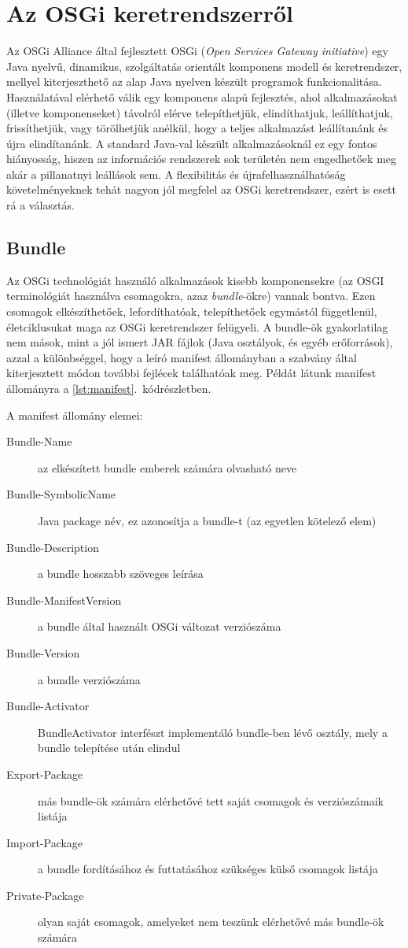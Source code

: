 \chapter{Az OSGi keretrendszerről}
\label{cha:osgi}

Az OSGi Alliance \cite{osgi} által fejlesztett OSGi (\textit{Open Services Gateway initiative}) egy Java nyelvű, dinamikus, szolgáltatás orientált komponens modell és keretrendszer, mellyel kiterjeszthető az alap Java nyelven készült programok funkcionalitása. Használatával elérhető válik egy komponens alapú fejlesztés, ahol alkalmazásokat (illetve komponenseket) távolról elérve telepíthetjük, elindíthatjuk, leállíthatjuk, frissíthetjük, vagy törölhetjük anélkül, hogy a teljes alkalmazást leállítanánk és újra elindítanánk. A standard Java-val készült alkalmazásoknál ez egy fontos hiányosság, hiszen az információs rendszerek sok területén nem engedhetőek meg akár a pillanatnyi leállások sem. A flexibilitás és újrafelhasználhatóság követelményeknek tehát nagyon jól megfelel az OSGi keretrendszer, ezért is esett rá a választás.

\section{Bundle}
\label{sec:bundle}

Az OSGi technológiát \cite{osgiintro} használó alkalmazások kisebb komponensekre (az OSGI terminológiát használva csomagokra, azaz \textit{bundle}-ökre) vannak bontva. Ezen csomagok elkészíthetőek, lefordíthatóak, telepíthetőek egymástól függetlenül, életciklusukat maga az OSGi keretrendszer felügyeli. A bundle-ök gyakorlatilag nem mások, mint a jól ismert JAR fájlok (Java osztályok, és egyéb erőforrások), azzal a különbséggel, hogy a leíró manifest állományban a szabvány által kiterjesztett módon további fejlécek találhatóak meg. Példát látunk manifest állományra a \ref{lst:manifest}.~kódrészletben.

A manifest állomány elemei:

\begin{description}
	\item[Bundle-Name] az elkészített bundle emberek számára olvasható neve
	\item[Bundle-SymbolicName] Java package név, ez azonosítja a bundle-t (az egyetlen kötelező elem)
	\item[Bundle-Description] a bundle hosszabb szöveges leírása
	\item[Bundle-ManifestVersion] a bundle által használt OSGi változat verziószáma
	\item[Bundle-Version] a bundle verziószáma
	\item[Bundle-Activator] BundleActivator interfészt implementáló bundle-ben lévő osztály, mely a bundle telepítése után elindul
	\item[Export-Package] más bundle-ök számára elérhetővé tett saját csomagok és verziószámaik listája
	\item[Import-Package] a bundle fordításához és futtatásához szükséges külső csomagok listája
	\item[Private-Package] olyan saját csomagok, amelyeket nem teszünk elérhetővé más bundle-ök számára
\end{description}

